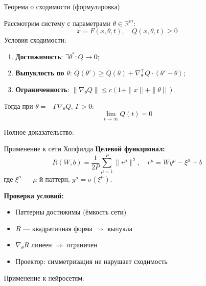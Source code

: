 \documentclass[10pt, aspectratio=169]{beamer}
\theoremstyle{plain}
\begin{document}
\begin{frame}{Теорема о сходимости (формулировка)}
  \begin{theorem}
    Рассмотрим систему с параметрами \(\theta \in \mathbb{R}^m\):
    \[
      \dot{x} = F(x, \theta, t), \quad Q(x, \theta, t) \ge 0
    \]
    Условия сходимости:
    \begin{enumerate}
      \item \textbf{Достижимость}: \(\exists \theta^*: Q \to 0\);
      \item \textbf{Выпуклость по \(\theta\)}:
            \(Q(\theta') \ge Q(\theta) + \nabla_\theta^\top Q \cdot (\theta' - \theta)\);
      \item \textbf{Ограниченность}: \(\|\nabla_\theta Q\| \le c(1 + \|x\| + \|\theta\|)\).
    \end{enumerate}
    Тогда при \(\dot{\theta} = -\Gamma \nabla_\theta \dot{Q}\), \(\Gamma > 0\):
    \[
      \lim_{t \to \infty} Q(t) = 0
    \]
  \end{theorem}

  \small{Полное доказательство: \cite{fradkov1979,fradkov2020}}
\end{frame}

\begin{frame}{Применение к сети Хопфилда}
  \textbf{Целевой функционал:}
  \begin{equation}
    R(W, b) = \frac{1}{2P} \sum_{\mu=1}^{P} \| r^\mu \|^2, \quad r^\mu = W y^\mu - \xi^\mu + b
  \end{equation}
  где \(\xi^\mu\) --- \(\mu\)-й паттерн, \(y^\mu = \sigma(\xi^\mu)\).

  \textbf{Проверка условий:}
  \begin{itemize}
    \item[\textbf{A1}] Паттерны достижимы (ёмкость сети)
    \item[\textbf{A2}] \(R\) — квадратичная форма \(\Rightarrow\) выпукла
    \item[\textbf{A3}] \(\nabla_\theta R\) линеен \(\Rightarrow\) ограничен
    \item[\textbf{A4}] Проектор: симметризация не нарушает сходимость \cite{borisov2023}
  \end{itemize}

  \small{Применение к нейросетям: \cite{teryaev2024,borisov2023}}
\end{frame}
\end{document}
